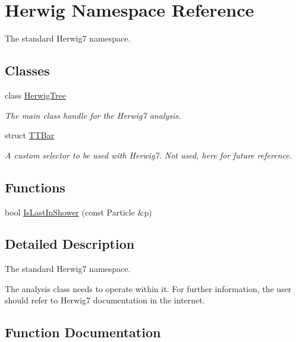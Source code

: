 \hypertarget{namespace_herwig}{}\section{Herwig Namespace Reference}
\label{namespace_herwig}


The standard Herwig7 namespace.  


\subsection*{Classes}
\begin{DoxyCompactItemize}
\item 
class \hyperlink{class_herwig_1_1_herwig_tree}{Herwig\+Tree}
\begin{DoxyCompactList}\small\item\em The main class handle for the Herwig7 analysis. \end{DoxyCompactList}\item 
struct \hyperlink{struct_herwig_1_1_t_t_bar}{T\+T\+Bar}
\begin{DoxyCompactList}\small\item\em A custom selector to be used with Herwig7. Not used, here for future reference. \end{DoxyCompactList}\end{DoxyCompactItemize}
\subsection*{Functions}
\begin{DoxyCompactItemize}
\item 
bool \hyperlink{namespace_herwig_a894b97666725581816a4523a5cc1684d}{Is\+Last\+In\+Shower} (const Particle \&p)
\end{DoxyCompactItemize}


\subsection{Detailed Description}
The standard Herwig7 namespace. 

The analysis class needs to operate within it. For further information, the user should refer to Herwig7 documentation in the internet. 

\subsection{Function Documentation}
